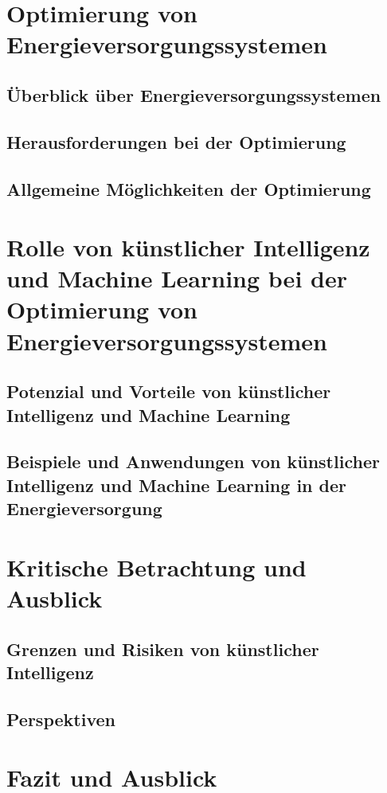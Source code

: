 \documentclass[conference]{IEEEtran}
\begin{document}
\section{Optimierung von Energieversorgungssystemen}

\subsection{Überblick über Energieversorgungssystemen}

\subsection{Herausforderungen bei der Optimierung}

\subsection{Allgemeine Möglichkeiten der Optimierung}


\section{Rolle von künstlicher Intelligenz und Machine Learning bei der Optimierung von Energieversorgungssystemen}

\subsection{Potenzial und Vorteile von künstlicher Intelligenz und Machine Learning}

\subsection{Beispiele und Anwendungen von künstlicher Intelligenz und Machine Learning in der Energieversorgung}


\section{Kritische Betrachtung und Ausblick}

\subsection{Grenzen und Risiken von künstlicher Intelligenz}

\subsection{Perspektiven}


\section{Fazit und Ausblick}


\printbibliography
\end{document}
